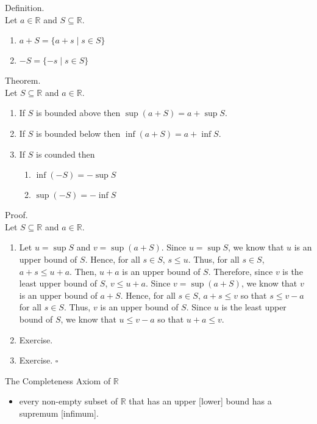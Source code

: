 \documentclass[twocolumn]{article}
\newcommand{\qed}{$\square$}
\newcommand{\br}{\vspace{\baselineskip}}
\newcommand{\reals}{\mathbb{R}}
\begin{document}
Definition. \\
Let $a \in \reals$ and $S \subseteq \reals$.
\begin{enumerate}
	\item
		$a + S = \{a + s \mid s \in S\}$
	\item
		$-S = \{-s \mid s \in S\}$
\end{enumerate} \br

Theorem. \\
Let $S \subseteq \reals$ and $a \in \reals$.
\begin{enumerate}
	\item
		If $S$ is bounded above then $\sup (a + S) = a + \sup S$.
	\item
		If $S$ is bounded below then $\inf (a + S) = a + \inf S$.
	\item
		If $S$ is counded then
		\begin{enumerate}
			\item
				$\inf (-S) = -\sup S$
			\item
				$\sup (-S) = -\inf S$
		\end{enumerate}
\end{enumerate}
Proof. \\
Let $S \subseteq \reals$ and $a \in \reals$.
\begin{enumerate}
	\item
		Let $u = \sup S$ and $v = \sup (a + S)$. Since $u = \sup S$, we know that $u$ is an upper bound of $S$. Hence, for all $s \in S$, $s \leq u$. Thus, for all $s \in S$, $a + s \leq u + a$. Then, $u + a$ is an upper bound of $S$. Therefore, since $v$ is the least upper bound of $S$, $v \leq u + a$. Since $v = \sup (a + S)$, we know that $v$ is an upper bound of $a + S$. Hence, for all $s \in S$, $a + s \leq v$ so that $s \leq v - a$ for all $s \in S$. Thus, $v$ is an upper bound of $S$. Since $u$ is the least upper bound of $S$, we know that $u \leq v - a$ so that $u + a \leq v$.
	\item
		Exercise.
	\item
		Exercise. \qed
\end{enumerate} \br

The Completeness Axiom of $\reals$
\begin{itemize}
	\item
		every non-empty subset of $\reals$ that has an upper [lower] bound has a supremum [infimum].
\end{itemize}
\end{document}
